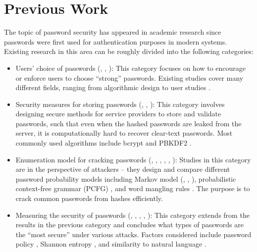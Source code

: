 \documentclass{article} %
\def\labelitemi{--}
\theoremstyle{definition}
\theoremstyle{theorem}
\theoremstyle{remark}
\theoremstyle{remark}
\begin{document}
\section{Previous Work}
\par\quad The topic of password security has appeared in academic research since passwords were first used for authentication purposes in modern systems. Existing research in this area can be roughly divided into the following categories:
\begin{itemize}
    \renewcommand\labelitemi{--}
    \item Users' choice of passwords (\cite{easypass}, \cite{measureup}, \cite{addbang}): This category focuses on how to encourage or enforce users to choose ``strong'' passwords. Existing studies cover many different fields, ranging from algorithmic design \cite{easypass} to user studies \cite{measureup}.

    \item Security measures for storing passwords (\cite{PKCS}, \cite{bcrypt}, \cite{scrypt}): This category involves designing secure methods for service providers to store and validate passwords, such that even when the hashed passwords are leaked from the server, it is computationally hard to recover clear-text passwords. Most commonly used algorithms include bcrypt \cite{bcrypt} and PBKDF2 \cite{PKCS}.
    
    \item Enumeration model for cracking passwords (\cite{omen}, \cite{john}, \cite{probabilistic}, \cite{timespace}, \cite{passmodel}, \cite{PCFG}): Studies in this category are in the perspective of attackers -- they design and compare different password probability models including Markov model (\cite{omen}, \cite{probabilistic}, \cite{timespace}), probabilistic context-free grammar (PCFG) \cite{PCFG}, and word mangling rules \cite{john}. The purpose is to crack common passwords from hashes efficiently.
    
    \item Measuring the security of passwords (\cite{adaptive markov}, \cite{empirical}, \cite{probframework}, \cite{againagain}, \cite{guessability}): This category extends from the results in the previous category and concludes what types of passwords are the ``most secure'' under various attacks. Factors considered include password policy \cite{againagain}, Shannon entropy \cite{adaptive markov}, and similarity to natural language \cite{empirical}.
\end{itemize}
\end{document}
